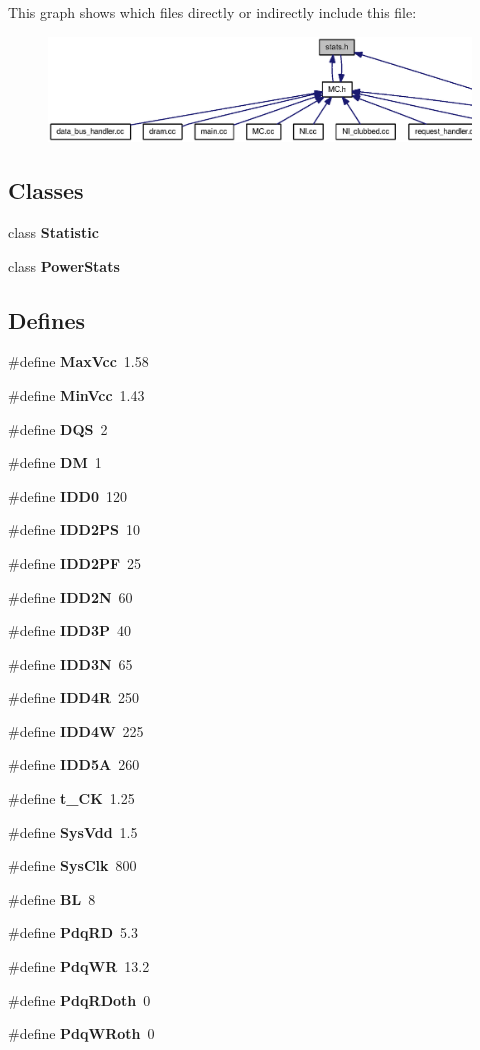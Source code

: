 This graph shows which files directly or indirectly include this file:\nopagebreak
\begin{figure}[H]
\begin{center}
\leavevmode
\includegraphics[width=402pt]{stats_8h__dep__incl}
\end{center}
\end{figure}
\subsection*{Classes}
\begin{CompactItemize}
\item 
class {\bf Statistic}
\item 
class {\bf PowerStats}
\end{CompactItemize}
\subsection*{Defines}
\begin{CompactItemize}
\item 
\#define {\bf MaxVcc}~1.58
\item 
\#define {\bf MinVcc}~1.43
\item 
\#define {\bf DQS}~2
\item 
\#define {\bf DM}~1
\item 
\#define {\bf IDD0}~120
\item 
\#define {\bf IDD2PS}~10
\item 
\#define {\bf IDD2PF}~25
\item 
\#define {\bf IDD2N}~60
\item 
\#define {\bf IDD3P}~40
\item 
\#define {\bf IDD3N}~65
\item 
\#define {\bf IDD4R}~250
\item 
\#define {\bf IDD4W}~225
\item 
\#define {\bf IDD5A}~260
\item 
\#define {\bf t\_\-CK}~1.25
\item 
\#define {\bf SysVdd}~1.5
\item 
\#define {\bf SysClk}~800
\item 
\#define {\bf BL}~8
\item 
\#define {\bf PdqRD}~5.3
\item 
\#define {\bf PdqWR}~13.2
\item 
\#define {\bf PdqRDoth}~0
\item 
\#define {\bf PdqWRoth}~0
\end{CompactItemize}


